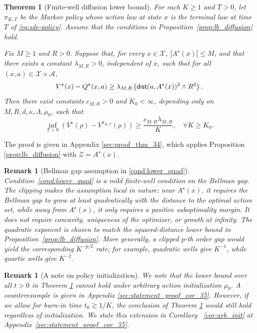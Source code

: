 \documentclass{article}
\newtheorem{thm}{Theorem}[section]
\newtheorem{rmk}[defn]{Remark}
\newcommand{\1}{\mathbbm{1}}
\newcommand{\dist}{{\sf dist}}
\numberwithin{equation}{section}
\begin{document}
\begin{thm}[Finite-well diffusion lower bound]\label{thm:lb_diffusion_initial}
For each $K\geq 1$ and $T>0$, let
$\pi_{K,T}$ be the Markov policy whose action law at state $x$ is the
terminal law at time $T$ of \eqref{eq:sde-policy}. Assume that the conditions in
Proposition~\ref{prop:lb_diffusion} hold. %

Fix $M\geq 1$ and $R>0$. Suppose that, for every $x\in\mathcal X$, %
$|A^\star(x)|\leq M$, and that 
there exists a constant $\lambda_{M,R}>0$, independent of $x$, such that for all $(x, a)\in \mathcal X \times \mathcal A$, 
\begin{align}\label{cond:lower_quad}
V^\star(x)-Q^\star(x,a)
\geq
\lambda_{M,R}
\left(
\dist(a,A^\star(x))^2\wedge R^2
\right).
\end{align}
Then there exist constants $c_{M,R}>0$ and $K_0<\infty$, depending only on
$M,R,d,\kappa,\Lambda,\mu_0$, such that  
\[
\inf_{T>0}
\left(
V^\star(\rho)-V^{\pi_{K,T}}(\rho)
\right)
\geq
\frac{c_{M,R}\lambda_{M,R}}{K},
\quad \forall K\geq K_0.
\]
\end{thm}
The proof is given in Appendix \ref{sec:proof_thm_34}, which applies Proposition \ref{prop:lb_diffusion} with $\mathcal{Z}=A^{\star}(x)$.

\begin{rmk}[Bellman gap assumption in \eqref{cond:lower_quad}]
Condition~\eqref{cond:lower_quad} is a mild finite-well condition on the Bellman gap.  The clipping makes the assumption local in nature: near \(A^\star(x)\), it requires the Bellman gap to grow at least quadratically with the distance to the optimal action set, while away from \(A^\star(x)\), it only requires a positive suboptimality margin. It does not require concavity, uniqueness of the
optimizer, or growth at infinity. The quadratic exponent is chosen to
match the squared-distance lower bound in Proposition~\ref{prop:lb_diffusion}.
More generally, a clipped \(p\)-th order gap would yield the corresponding \(K^{-p/2}\) rate; for example, quadratic wells give \(K^{-1}\), while quartic wells give \(K^{-2}\).
\end{rmk}

\begin{rmk}[A note on policy initialization]
 We note that the lower bound over \textit{all} $t>0$ in Theorem \ref{thm:lb_diffusion_initial} cannot hold under arbitrary action initialization $\mu_0$. A counterexample is given in Appendix \ref{sec:statement_proof_cor_35}. However, if we allow for burn-in time $t_{0}\gtrsim 1/K$, the conclusion of Theorem \ref{thm:lb_diffusion_initial} would still hold regardless of initialization. %
We state this extension in Corollary ~\ref{cor:arb_init} at Appendix~\ref{sec:statement_proof_cor_35}. 
\end{rmk}
\end{document}

